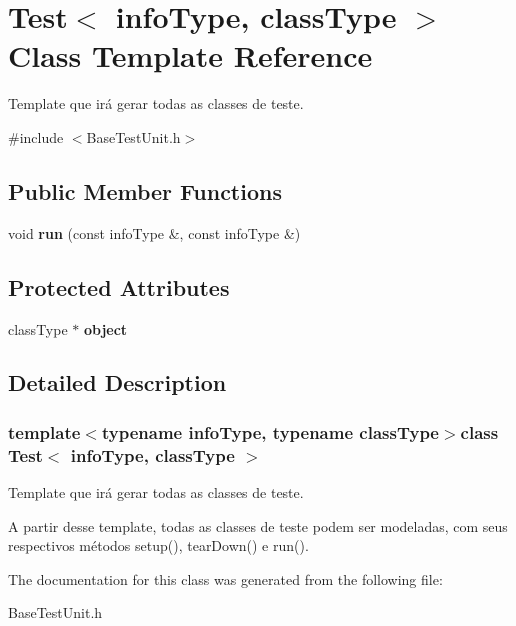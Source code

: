 \hypertarget{classTest}{\section{Test$<$ info\-Type, class\-Type $>$ Class Template Reference}
\label{df/da6/classTest}
}


Template que irá gerar todas as classes de teste.  




{\ttfamily \#include $<$Base\-Test\-Unit.\-h$>$}

\subsection*{Public Member Functions}
\begin{DoxyCompactItemize}
\item 
\hypertarget{classTest_af4efb793913e8172ec96f64dd990b777}{void {\bfseries run} (const info\-Type \&, const info\-Type \&)}\label{df/da6/classTest_af4efb793913e8172ec96f64dd990b777}

\end{DoxyCompactItemize}
\subsection*{Protected Attributes}
\begin{DoxyCompactItemize}
\item 
\hypertarget{classTest_ad228fd201d56aea9ebf26f7a5aefd2c1}{class\-Type $\ast$ {\bfseries object}}\label{df/da6/classTest_ad228fd201d56aea9ebf26f7a5aefd2c1}

\end{DoxyCompactItemize}


\subsection{Detailed Description}
\subsubsection*{template$<$typename info\-Type, typename class\-Type$>$class Test$<$ info\-Type, class\-Type $>$}

Template que irá gerar todas as classes de teste. 

A partir desse template, todas as classes de teste podem ser modeladas, com seus respectivos métodos setup(), tear\-Down() e run(). 

The documentation for this class was generated from the following file\-:\begin{DoxyCompactItemize}
\item 
Base\-Test\-Unit.\-h\end{DoxyCompactItemize}
